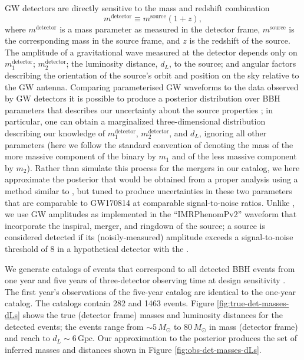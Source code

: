 \documentclass[modern]{aastex62}
\newcommand{\mdet}{m^\mathrm{detector}}
\newcommand{\monedet}{m_1^\mathrm{detector}}
\newcommand{\mtwodet}{m_2^\mathrm{detector}}
\newcommand{\msource}{m^\mathrm{source}}
\newcommand{\None}{282}
\newcommand{\Nfive}{1463}
\newcommand{\Gpc}{\mathrm{Gpc}}
\newcommand{\MSun}{M_\odot}
\begin{document}
\Ac{GW} detectors are directly sensitive to the mass and redshift combination
%
\begin{equation}
  \label{eq:Mdet-definition}
  \mdet \equiv \msource \left( 1 + z \right),
\end{equation}
%
where $\mdet$ is a mass parameter as measured in the detector frame, $\msource$
is the corresponding mass in the source frame, and $z$ is the redshift of the
source.  The amplitude of a gravitational wave measured at the detector depends
only on $\monedet$; $\mtwodet$; the luminosity distance, $d_L$, to the source;
and angular factors describing the orientation of the source's orbit and
position on the sky relative to the \ac{GW} antenna. Comparing parameterised
\ac{GW} waveforms
\citep[e.g.][]{Taracchini2014,Bohe2017,Smith2016,Kahn2016,Chatziioannou2017} to
the data observed by \ac{GW} detectors it is possible to produce a posterior
distribution over \ac{BBH} parameters that describes our uncertainty about the
source properties \citep{Veitch2015,GW150914-PE}; in particular, one can obtain
a marginalized three-dimensional distribution describing our knowledge of
$\monedet$, $\mtwodet$, and $d_L$, ignoring all other parameters (here we follow
the standard convention of denoting the mass of the more massive component of
the binary by $m_1$ and of the less massive component by $m_2$).  Rather than
simulate this process for the mergers in our catalog, we here approximate the
posterior that would be obtained from a proper analysis using a method similar
to \citet{Fishbach2018}, but tuned to produce uncertainties in these two
parameters that are comparable to GW170814 \citep{GW170814} at comparable
signal-to-noise ratios.  Unlike \citet{Fishbach2018}, we use \ac{GW} amplitudes
as implemented in the ``IMRPhenomPv2'' waveform \citep{Kahn2016} that
incorporate the inspiral, merger, and ringdown of the source; a source is
considered detected if its (noisily-measured) amplitude exceeds a
signal-to-noise threshold of 8 in a hypothetical detector with the .  

We generate catalogs of events that correspond to all detected \ac{BBH} events
from one year and five years of three-detector observing time at design
sensitivity \citep{AdvancedLIGO,AdvancedVIRGO}.  The first year's observations
of the five-year catalog are identical to the one-year catalog. The catalogs
contain \None{} and \Nfive{} events.  Figure \ref{fig:true-det-masses-dLs} shows
the true (detector frame) masses and luminosity distances for the detected
events; the events range from $\sim 5 \, \MSun$ to $80 \, \MSun$ in mass
(detector frame) and reach to $d_L \sim 6 \, \Gpc$.  Our approximation to the
posterior produces the set of inferred masses and distances shown in Figure
\ref{fig:obs-det-masses-dLs}.
\end{document}
